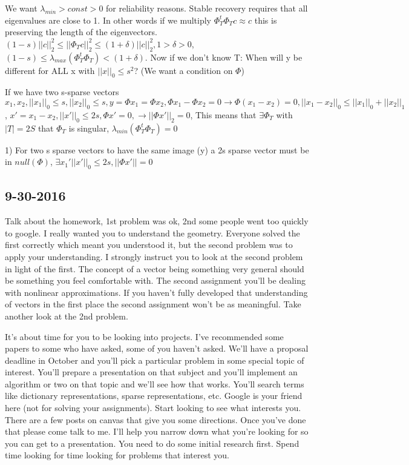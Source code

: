 \documentclass[12pt,letterpaper]{report}
\begin{document}
We want $\lambda_{min} > const > 0$ for reliability reasons.  Stable recovery requires that all eigenvalues are close to 1.  In other words if we multiply $\Phi_T^t \Phi_T c \approx c$ this is preserving the length of the eigenvectors.  $(1 - s) ||c||_2^2 \leq ||\Phi_T c||_2^2 \leq (1 + \delta)||c||_2^2, 1 > \delta > 0$, $(1 - s) \leq \lambda_{max}(\Phi_T^t \Phi_T) < (1 + \delta)$.  Now if we don't know T: When will y be different for ALL x with $||x||_0 \leq s^2$? (We want a condition on $\Phi$) 

If we have two s-sparse vectors $x_1, x_2, ||x_1||_0 \leq s, ||x_2||_0 \leq s, y = \Phi x_1 = \Phi x_2, \Phi x_1 - \Phi x_2 = 0 \rightarrow \Phi (x_1 - x_2) = 0, ||x_1 - x_2||_0 \leq ||x_1||_0 + ||x_2||_1$, $x' = x_1 - x_2, ||x'||_0 \leq 2s, \Phi x' = 0, \rightarrow ||\Phi x'||_2 = 0$,  This means that $\exists \Phi_T$ with $|T| = 2S$ that $\Phi_T$ is singular, $\lambda_{min}(\Phi_T^t \Phi_T) = 0$

1) For two s sparse vectors to have the same image (y) a 2s sparse vector must be in $null(\Phi)$, $\exists x_1' ||x'||_0 \leq 2s, ||\Phi x'|| = 0$ 

\subsection*{9-30-2016}

Talk about the homework, 1st problem was ok, 2nd some people went too quickly to google.  I really wanted you to understand the geometry.  Everyone solved the first correctly which meant you understood it, but the second problem was to apply your understanding.  I strongly instruct you to look at the second problem in light of the first.  The concept of a vector being something very general should be something you feel comfortable with.  The second assignment you'll be dealing with nonlinear approximations.  If you haven't fully developed that understanding of vectors in the first place the second assignment won't be as meaningful.  Take another look at the 2nd problem.

It's about time for you to be looking into projects.  I've recommended some papers to some who have asked, some of you haven't asked.  We'll have a proposal deadline in October and you'll pick a particular problem in some special topic of interest.  You'll prepare a presentation on that subject and you'll implement an algorithm or two on that topic and we'll see how that works.  You'll search terms like dictionary representations, sparse representations, etc.  Google is your friend here (not for solving your assignments).  Start looking to see what interests you.  There are a few posts on canvas that give you some directions.  Once you've done that please come talk to me.  I'll help you narrow down what you're looking for so you can get to a presentation.  You need to do some initial research first.  Spend time looking for time looking for problems that interest you.
\end{document}
